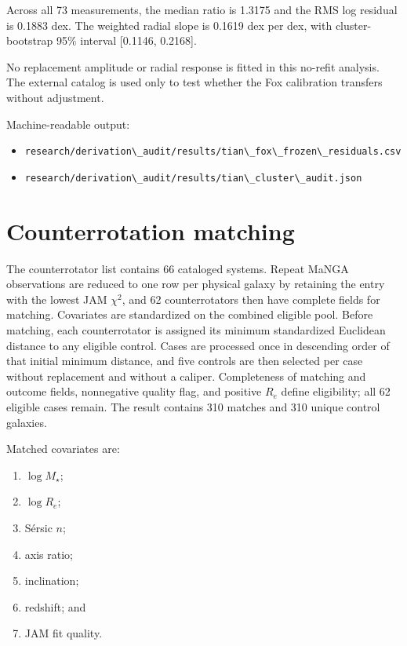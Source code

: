 \documentclass[utf8]{frontiers_suppmat}
\providecommand{\tightlist}{}
\newcommand{\passthrough}[1]{#1}
\begin{document}
Across all 73 measurements, the median ratio is 1.3175 and the RMS log residual is 0.1883 dex. The weighted radial slope is 0.1619 dex per dex, with cluster-bootstrap 95\% interval {[}0.1146, 0.2168{]}.

No replacement amplitude or radial response is fitted in this no-refit analysis. The external catalog is used only to test whether the Fox calibration transfers without adjustment.

Machine-readable output:

\begin{itemize}
\tightlist
\item
  \passthrough{\lstinline!research/derivation\_audit/results/tian\_fox\_frozen\_residuals.csv!}
\item
  \passthrough{\lstinline!research/derivation\_audit/results/tian\_cluster\_audit.json!}
\end{itemize}

\section{Counterrotation matching}\label{s7.-counterrotation-matching}

The counterrotator list contains 66 cataloged systems. Repeat MaNGA observations are reduced to one row per physical galaxy by retaining the entry with the lowest JAM \(\chi^2\), and 62 counterrotators then have complete fields for matching. Covariates are standardized on the combined eligible pool. Before matching, each counterrotator is assigned its minimum standardized Euclidean distance to any eligible control. Cases are processed once in descending order of that initial minimum distance, and five controls are then selected per case without replacement and without a caliper. Completeness of matching and outcome fields, nonnegative quality flag, and positive \(R_e\) define eligibility; all 62 eligible cases remain. The result contains 310 matches and 310 unique control galaxies.

Matched covariates are:

\begin{enumerate}
\def\labelenumi{\arabic{enumi}.}
\tightlist
\item
  \(\log M_\star\);
\item
  \(\log R_e\);
\item
  Sérsic \(n\);
\item
  axis ratio;
\item
  inclination;
\item
  redshift; and
\item
  JAM fit quality.
\end{enumerate}
\end{document}
